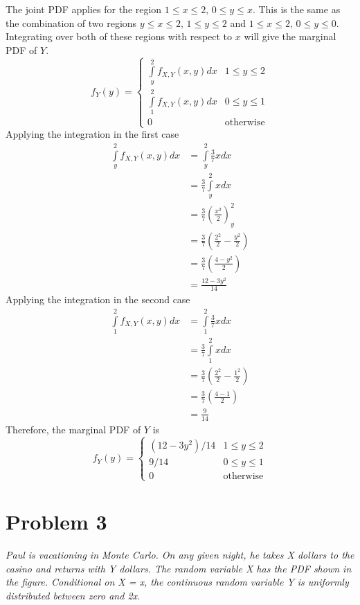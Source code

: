 \documentclass{article}
\begin{document}
The joint PDF applies for the region $ 1 \leq x \leq 2,\, 0 \leq y \leq x $.
This is the same as the combination of two regions $ y \leq x \leq 2,\, 1
\leq y \leq 2 $ and $ 1 \leq x \leq 2,\, 0 \leq y \leq 0 $. Integrating over
both of these regions with respect to $x$ will give the marginal PDF of $Y$.
$$ f_Y(y) = \begin{cases}
    \int\limits_y^2 f_{X,Y}(x, y) dx & 1 \leq y \leq 2 \\
    \int\limits_1^2 f_{X,Y}(x, y) dx & 0 \leq y \leq 1 \\
    0 & \mathrm{otherwise}
\end{cases} $$
Applying the integration in the first case
\begin{align*}
    \int\limits_y^2 f_{X,Y}(x, y) dx &= \int\limits_y^2 \frac{3}{7} x dx \\
    &= \frac{3}{7} \int\limits_y^2 x dx \\
    &= \frac{3}{7} \left( \frac{x^2}{2} \right)_y^2 \\
    &= \frac{3}{7} \left( \frac{2^2}{2} - \frac{y^2}{2} \right) \\
    &= \frac{3}{7} \left( \frac{4 - y^2}{2} \right) \\
    &= \frac{12 - 3 y^2}{14}
\end{align*}
Applying the integration in the second case
\begin{align*}
    \int\limits_1^2 f_{X,Y}(x, y) dx &= \int\limits_1^2 \frac{3}{7} x dx \\
    &= \frac{3}{7} \int\limits_1^2 x dx \\
    &= \frac{3}{7} \left( \frac{2^2}{2} - \frac{1^2}{2} \right) \\
    &= \frac{3}{7} \left( \frac{4 - 1}{2} \right) \\
    &= \frac{9}{14}
\end{align*}
Therefore, the marginal PDF of $Y$ is
$$ f_Y(y) = \begin{cases}
    \left( 12 - 3 y^2 \right) / 14 & 1 \leq y \leq 2 \\
    9 / 14 & 0 \leq y \leq 1 \\
    0 & \mathrm{otherwise}
\end{cases} $$

\section*{Problem 3}

\textit{Paul is vacationing in Monte Carlo. On any given night, he takes X
dollars to the casino and returns with Y dollars. The random variable X has
the PDF shown in the figure. Conditional on X = x, the continuous random
variable Y is uniformly distributed between zero and 2x.}
\end{document}

